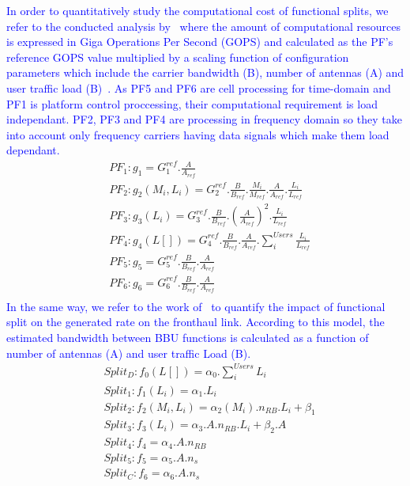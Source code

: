 \documentclass[
    a4paper, 
    12pt, onecolumn,
]{article}
\begin{document}
\textcolor{blue}{
In order to quantitatively study the computational cost of functional splits, we refer to the conducted analysis by~\cite{CITE-020} where the amount of computational resources is expressed in Giga Operations Per Second (GOPS) and calculated as the PF’s reference GOPS value multiplied by a scaling function of configuration parameters which include the carrier bandwidth (B), number of antennas (A) and user traffic load (B)~\cite{CITE-020}. As PF5 and PF6 are cell processing for time-domain and PF1 is platform control proccessing, their computational requirement is load independant. PF2, PF3 and PF4 are processing in frequency domain so they take into account only frequency carriers having data signals which make them load dependant.
}
\begin{equation*}
\begin{aligned}
&PF_{1} : g_1 = G_{1}^{ref} . \frac{A}{A_{ref}} \\
&PF_{2} : g_2(M_i,L_i) = G_{2}^{ref} . \frac{B }{B_{ref}} .  \frac{M_i }{M_{ref}} . \frac{A}{A_{ref}} . \frac{L_i}{L_{ref}} \\
&PF_{3} : g_3(L_i) = G_{3}^{ref} . \frac{B }{B_{ref}} . (\frac{A}{A_{ref}} )^2 . \frac{L_i}{L_{ref}} \\
&PF_{4} : g_4(L[]) = G_{4}^{ref} . \frac{B }{B_{ref}} . \frac{A}{A_{ref}} . \sum_{i}^{Users}  \frac{L_i}{L_{ref}} \\
&PF_{5} : g_5 = G_{5}^{ref} . \frac{B }{B_{ref}} . \frac{A}{A_{ref}} \\
&PF_{6} : g_6 = G_{6}^{ref} . \frac{B }{B_{ref}} . \frac{A}{A_{ref}} \\
\end{aligned}
\end{equation*} 
\textcolor{blue}{
In the same way, we refer to the work of~\cite{CITE-008} to quantify the impact of functional split on the generated rate on the fronthaul link. According to this model, the estimated bandwidth between BBU functions is calculated as a function of number of antennas (A) and user traffic Load (B).  
}
\begin{equation*}
\begin{aligned}
&Split_D  : f_0(L[]) = \alpha_0 . \sum_{i}^{Users} L_i\\
&Split_{1}  : f_1(L_i) = \alpha_1 . L_i\\
&Split_{2}  : f_2(M_i,L_i) = \alpha_2(M_i) . n_{RB} . L_i + \beta_1 \\
&Split_{3}  : f_3(L_i) = \alpha_3 . A . n_{RB} . L_i + \beta_2 . A\\
&Split_{4}  : f_4 = \alpha_4 . A. n_{RB} \\
&Split_{5}  : f_5 = \alpha_5 . A . n_s \\
&Split_C  : f_6 = \alpha_6 . A . n_s 
\end{aligned}
\end{equation*} 
\end{document}
